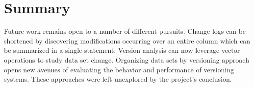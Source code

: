 \section{Summary}

Future work remains open to a number of different pursuits.
Change logs can be shortened by discovering modifications occurring over an entire column which can be summarized in a single statement.
Version analysis can now leverage vector operations to study data set change.
Organizing data sets by versioning approach opens new avenues of evaluating the behavior and performance of versioning systems.
These approaches were left unexplored by the project's conclusion.